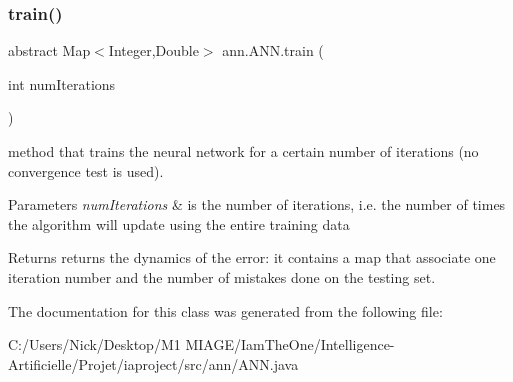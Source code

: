 \subsubsection{\texorpdfstring{train()}{train()}}
{\footnotesize\ttfamily abstract Map$<$Integer,Double$>$ ann.\+A\+N\+N.\+train (\begin{DoxyParamCaption}\item[{int}]{num\+Iterations }\end{DoxyParamCaption})\hspace{0.3cm}{\ttfamily [abstract]}}

method that trains the neural network for a certain number of iterations (no convergence test is used). 
\begin{DoxyParams}{Parameters}
{\em num\+Iterations} & is the number of iterations, i.\+e. the number of times the algorithm will update using the entire training data \\
\hline
\end{DoxyParams}
\begin{DoxyReturn}{Returns}
returns the dynamics of the error\+: it contains a map that associate one iteration number and the number of mistakes done on the testing set. 
\end{DoxyReturn}


The documentation for this class was generated from the following file\+:\begin{DoxyCompactItemize}
\item 
C\+:/\+Users/\+Nick/\+Desktop/\+M1 M\+I\+A\+G\+E/\+Iam\+The\+One/\+Intelligence-\/\+Artificielle/\+Projet/iaproject/src/ann/A\+N\+N.\+java\end{DoxyCompactItemize}
